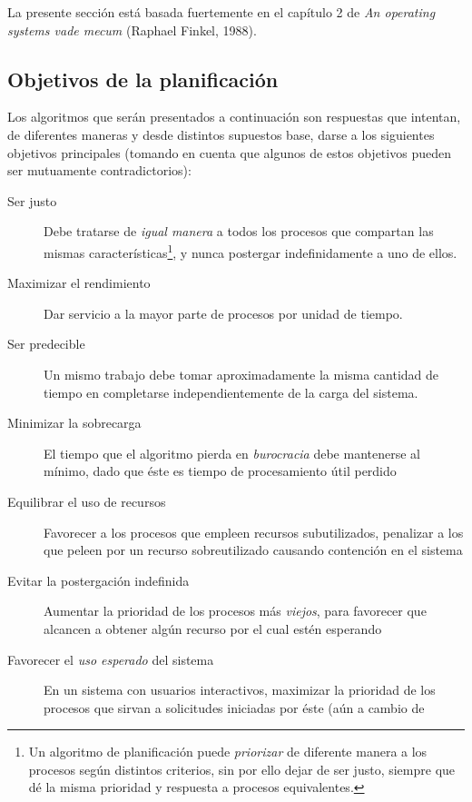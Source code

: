 \documentclass[11pt,fleqn]{book} %
\begin{document}
La presente sección está basada fuertemente en el capítulo 2 de \emph{An operating systems vade mecum} (Raphael Finkel, 1988).
\subsection{Objetivos de la planificación}
\label{sec-4-2-1}


Los algoritmos que serán presentados a continuación son respuestas
que intentan, de diferentes maneras y desde distintos supuestos base,
darse a los siguientes objetivos principales (tomando en cuenta que
algunos de estos objetivos pueden ser mutuamente contradictorios):

\begin{description}
\item[Ser justo] Debe tratarse de \emph{igual manera} a todos los procesos
               que compartan las mismas características\footnote{Un
               algoritmo de planificación puede \emph{priorizar} de
               diferente manera a los procesos según distintos
               criterios, sin por ello dejar de ser justo, siempre que
               dé la misma prioridad y respuesta a procesos
               equivalentes. }, y nunca postergar indefinidamente a uno
               de ellos.
\item[Maximizar el rendimiento] Dar servicio a la mayor parte de
     procesos por unidad de tiempo.
\item[Ser predecible] Un mismo trabajo debe tomar aproximadamente la
                    misma cantidad de tiempo en completarse
                    independientemente de la carga del sistema.
\item[Minimizar la sobrecarga] El tiempo que el algoritmo pierda en
     \emph{burocracia} debe mantenerse al mínimo, dado que éste es tiempo
     de procesamiento útil perdido
\item[Equilibrar el uso de recursos] Favorecer a los procesos que
     empleen recursos subutilizados, penalizar a los que peleen por
     un recurso sobreutilizado causando contención en el sistema
\item[Evitar la postergación indefinida] Aumentar la prioridad de los
     procesos más \emph{viejos}, para favorecer que alcancen a obtener
     algún recurso por el cual estén esperando
\item[Favorecer el \emph{uso esperado} del sistema] En un sistema con
     usuarios interactivos, maximizar la prioridad de los procesos
     que sirvan a solicitudes iniciadas por éste (aún a cambio de

\end{description}
\end{document}
